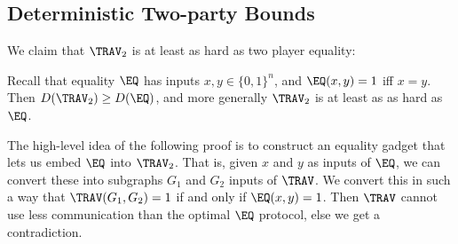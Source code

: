 \subsection{Deterministic Two-party Bounds}

We claim that $\TRAV_2$ is at least as hard as two player equality:

\begin{claim}
\label{claim:equality-trav-bound}
Recall that equality $\EQ$ has inputs $x,y \in \{0,1\}^n$, and $\EQ(x,y) = 1$ iff $x = y$. Then $D(\TRAV_2) \geq D(\EQ)$, and more generally $\TRAV_2$ is at least as as hard as $\EQ$.
\end{claim}

The high-level idea of the following proof is to construct an equality gadget that lets us embed $\EQ$ into $\TRAV_2$. That is, given $x$ and $y$ as inputs of $\EQ$, we can convert these into subgraphs $G_1$ and $G_2$ inputs of $\TRAV$. We convert this in such a way that $\TRAV(G_1, G_2) = 1$ if and only if $\EQ(x,y) = 1$. Then $\TRAV$ cannot use less communication than the optimal $\EQ$ protocol, else we get a contradiction.

